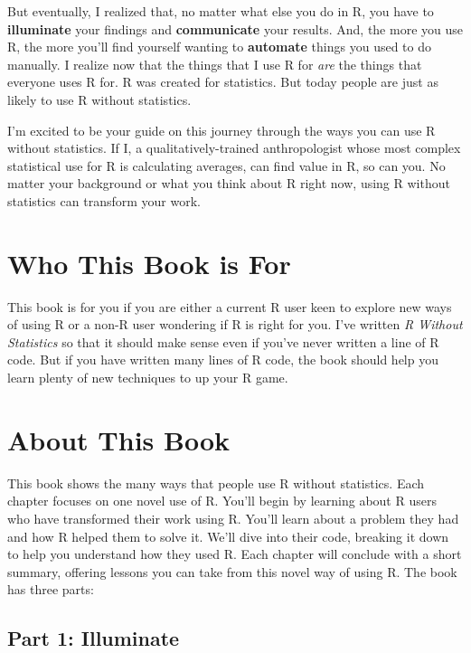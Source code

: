 \documentclass[
]{book}
\begin{document}
But eventually, I realized that, no matter what else you do in R, you have to \textbf{illuminate} your findings and \textbf{communicate} your results. And, the more you use R, the more you'll find yourself wanting to \textbf{automate} things you used to do manually. I realize now that the things that I use R for \emph{are} the things that everyone uses R for. R was created for statistics. But today people are just as likely to use R without statistics.

I'm excited to be your guide on this journey through the ways you can use R without statistics. If I, a qualitatively-trained anthropologist whose most complex statistical use for R is calculating averages, can find value in R, so can you. No matter your background or what you think about R right now, using R without statistics can transform your work.

\hypertarget{who-this-book-is-for}{%
\section*{Who This Book is For}\label{who-this-book-is-for}}

This book is for you if you are either a current R user keen to explore new ways of using R or a non-R user wondering if R is right for you. I've written \emph{R Without Statistics} so that it should make sense even if you've never written a line of R code. But if you have written many lines of R code, the book should help you learn plenty of new techniques to up your R game.

\hypertarget{about-this-book}{%
\section*{About This Book}\label{about-this-book}}

This book shows the many ways that people use R without statistics. Each chapter focuses on one novel use of R. You'll begin by learning about R users who have transformed their work using R. You'll learn about a problem they had and how R helped them to solve it. We'll dive into their code, breaking it down to help you understand how they used R. Each chapter will conclude with a short summary, offering lessons you can take from this novel way of using R. The book has three parts:

\hypertarget{part-1-illuminate}{%
\subsection*{Part 1: Illuminate}\label{part-1-illuminate}}
\end{document}
